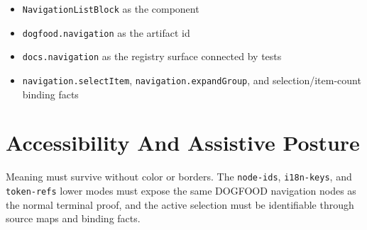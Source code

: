 \begin{itemize}
\tightlist
\item
  \texttt{N\allowbreak{}a\allowbreak{}v\allowbreak{}i\allowbreak{}g\allowbreak{}a\allowbreak{}t\allowbreak{}i\allowbreak{}o\allowbreak{}n\allowbreak{}L\allowbreak{}i\allowbreak{}s\allowbreak{}t\allowbreak{}B\allowbreak{}l\allowbreak{}o\allowbreak{}c\allowbreak{}k} as the component
\item
  \texttt{d\allowbreak{}o\allowbreak{}g\allowbreak{}f\allowbreak{}o\allowbreak{}o\allowbreak{}d\allowbreak{}.\allowbreak{}n\allowbreak{}a\allowbreak{}v\allowbreak{}i\allowbreak{}g\allowbreak{}a\allowbreak{}t\allowbreak{}i\allowbreak{}o\allowbreak{}n} as the artifact id
\item
  \texttt{d\allowbreak{}o\allowbreak{}c\allowbreak{}s\allowbreak{}.\allowbreak{}n\allowbreak{}a\allowbreak{}v\allowbreak{}i\allowbreak{}g\allowbreak{}a\allowbreak{}t\allowbreak{}i\allowbreak{}o\allowbreak{}n} as the registry surface connected by tests
\item
  \texttt{n\allowbreak{}a\allowbreak{}v\allowbreak{}i\allowbreak{}g\allowbreak{}a\allowbreak{}t\allowbreak{}i\allowbreak{}o\allowbreak{}n\allowbreak{}.\allowbreak{}s\allowbreak{}e\allowbreak{}l\allowbreak{}e\allowbreak{}c\allowbreak{}t\allowbreak{}I\allowbreak{}t\allowbreak{}e\allowbreak{}m}, \texttt{n\allowbreak{}a\allowbreak{}v\allowbreak{}i\allowbreak{}g\allowbreak{}a\allowbreak{}t\allowbreak{}i\allowbreak{}o\allowbreak{}n\allowbreak{}.\allowbreak{}e\allowbreak{}x\allowbreak{}p\allowbreak{}a\allowbreak{}n\allowbreak{}d\allowbreak{}G\allowbreak{}r\allowbreak{}o\allowbreak{}u\allowbreak{}p}, and selection/item-count binding facts
\end{itemize}

\section{Accessibility And Assistive Posture}\label{record-142-accessibility-and-assistive-posture}

Meaning must survive without color or borders. The \texttt{n\allowbreak{}o\allowbreak{}d\allowbreak{}e\allowbreak{}-\allowbreak{}i\allowbreak{}d\allowbreak{}s}, \texttt{i\allowbreak{}1\allowbreak{}8\allowbreak{}n\allowbreak{}-\allowbreak{}k\allowbreak{}e\allowbreak{}y\allowbreak{}s}, and \texttt{t\allowbreak{}o\allowbreak{}k\allowbreak{}e\allowbreak{}n\allowbreak{}-\allowbreak{}r\allowbreak{}e\allowbreak{}f\allowbreak{}s} lower modes must expose the same DOGFOOD navigation nodes as the normal terminal proof, and the active selection must be identifiable through source maps and binding facts.

